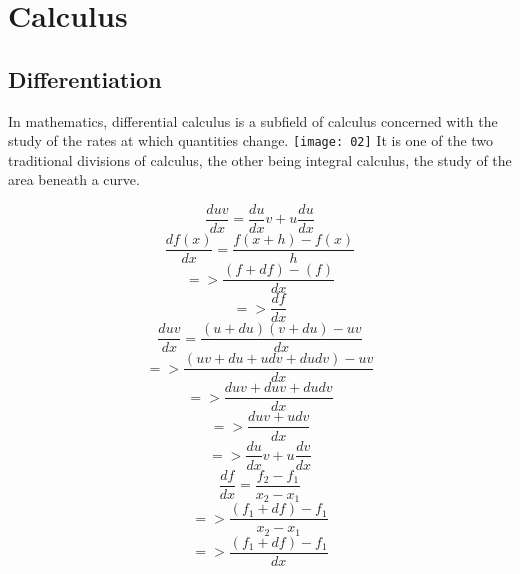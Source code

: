 
\graphicspath{ {./Pictures/} }

\chapter{Calculus}
\section{Differentiation}

	In mathematics, differential calculus is a subfield of calculus concerned with the study of the rates at which quantities change.
	\texttt{[image: 02]}
	It is one of the two traditional divisions of calculus, the other being integral calculus, the study of the area beneath a curve.
	
	\begin{equation}
	\frac{duv}{dx}=\frac{du}{dx}v+u\frac{du}{dx}
	\end{equation}
	\begin{displaymath}
	\frac{df(x)}{dx} = \frac{f(x+h)-f(x)}{h}
	\end{displaymath}
	\begin{displaymath}
	=> \frac{(f+df)-(f)}{dx}
	\end{displaymath}
	\begin{displaymath}
	=>\frac{df}{dx}
	\end{displaymath}
	\newline
	\begin{displaymath}
	\frac{duv}{dx} = \frac{(u+du)(v+du)-uv}{dx}
	\end{displaymath}
	\begin{displaymath}
	=>\frac{(uv+du+udv+dudv)-uv}{dx}
	\end{displaymath}
	\begin{displaymath}
	=> \frac{duv+duv+dudv}{dx}
	\end{displaymath}
	\begin{displaymath}
	=> \frac{duv+udv}{dx}
	\end{displaymath}
	\begin{displaymath}
	=> \frac{du}{dx}v+u\frac{dv}{dx}
	\end{displaymath}
	\newline
	\begin{displaymath}
	\frac{df}{dx} = \frac{f_2-f_1}{x_2-x_1}
	\end{displaymath}
	\begin{displaymath}
	=>\frac{(f_1+df)-f_1}{x_2-x_1}
	\end{displaymath}
	\begin{displaymath}
	=>\frac{(f_1+df)-f_1}{dx}
	\end{displaymath}

